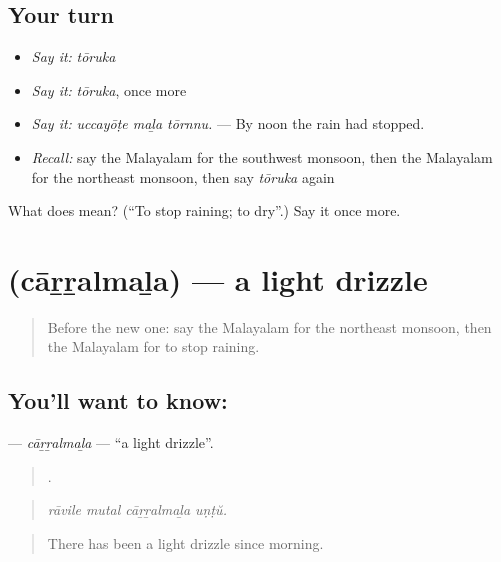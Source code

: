 \subsection*{Your turn}
\begin{itemize}
\raggedright
  \item \emph{Say it:} \emph{tōruka}
  \item \emph{Say it:} \emph{tōruka}, once more
  \item \emph{Say it:} \emph{uccayōṭe maḻa tōrnnu.} — By noon the rain had stopped.
  \item \emph{Recall:} say the Malayalam for the southwest monsoon, then the Malayalam for the northeast monsoon, then say \emph{tōruka} again
\end{itemize}

\begin{tcolorbox}[breakable,colback=teal!4,colframe=teal!35!black,title={Before you move on}]
What does  mean? (\textquotedblleft{}To stop raining; to dry\textquotedblright{}.) Say it once more.
\end{tcolorbox}
\section[\texorpdfstring{\ml{ചാറ്റൽമഴ} (cāṟṟalmaḻa)}{ചാറ്റൽമഴ (cāṟṟalmaḻa)}]{ (cāṟṟalmaḻa) — a light drizzle}

\label{lesson:ML-C507-carralmala}



\begin{quote}
Before the new one: say the Malayalam for the northeast monsoon, then the Malayalam for to stop raining.
\end{quote}

\subsection*{You'll want to know: }
\textbf{} — \emph{cāṟṟalmaḻa} — \textquotedblleft{}a light drizzle\textquotedblright{}.

\begin{quote}
   .
\end{quote}

\begin{quote}
\emph{rāvile mutal cāṟṟalmaḻa uṇṭŭ.}
\end{quote}

\begin{quote}
There has been a light drizzle since morning.
\end{quote}

